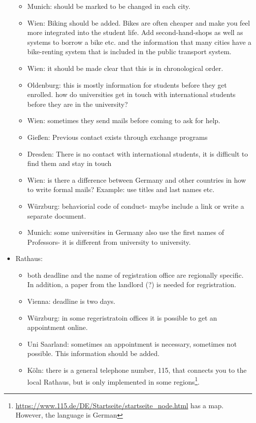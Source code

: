 \begin{itemize}
\begin{itemize}
            \item Munich: should be marked to be changed in each city.
            \item Wien: Biking should be added. Bikes are often cheaper and make you feel more integrated into the student life. Add second-hand-shops as well as systems to borrow a bike etc. and the information that many cities have a bike-renting system that is included in the public transport system.
            \item Wien: it should be made clear that this is in chronological order.
            \item Oldenburg: this is mostly information for students before they get enrolled. how do universities get in touch with international students before they are in the university?
            \item Wien: sometimes they send mails before coming to ask for help.
            \item Gießen: Previous contact exists through exchange programs
            \item Dresden: There is no contact with international students, it is difficult to find them and stay in touch
            \item Wien: is there a difference between Germany and other countries in how to write formal mails? Example: use titles and last names etc.
            \item Würzburg: behaviorial code of conduct- maybe include a link or write a separate document.
            \item Munich: some universities in Germany also use the first names of Professors- it is different from university to university.
          \end{itemize}

        \item Rathaus:
          \begin{itemize}
            \item both deadline and the name of registration office are regionally specific. In addition, a paper from the landlord (?) is needed for regristration.
            \item Vienna: deadline is two days.
            \item Würzburg: in some regeristratoin offices it is possible to get an appointment online.
            \item Uni Saarland: sometimes an appointment is necessary, sometimes not possible. This information should be added.
            \item Köln: there is a general telephone number, 115, that connects you to the local Rathaus, but is only implemented in some regions\footnote{\url{https://www.115.de/DE/Startseite/startseite_node.html} has a map. However, the language is German}.
          \end{itemize}


\end{itemize}
